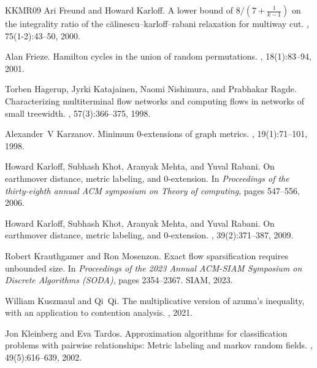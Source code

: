 \documentclass[11pt]{article}
\theoremstyle{definition}
\begin{document}
\begin{thebibliography}{KKMR09}
Ari Freund and Howard Karloff.
\newblock A lower bound of {$8/(7+ \frac{1}{k-1})$} on the integrality ratio of
  the c{\u{a}}linescu--karloff--rabani relaxation for multiway cut.
, 75(1-2):43--50, 2000.

Alan Frieze.
\newblock Hamilton cycles in the union of random permutations.
, 18(1):83--94, 2001.

Torben Hagerup, Jyrki Katajainen, Naomi Nishimura, and Prabhakar Ragde.
\newblock Characterizing multiterminal flow networks and computing flows in
  networks of small treewidth.
, 57(3):366--375, 1998.

Alexander~V Karzanov.
\newblock Minimum 0-extensions of graph metrics.
, 19(1):71--101, 1998.

Howard Karloff, Subhash Khot, Aranyak Mehta, and Yuval Rabani.
\newblock On earthmover distance, metric labeling, and 0-extension.
\newblock In {\em Proceedings of the thirty-eighth annual ACM symposium on
  Theory of computing}, pages 547--556, 2006.

Howard Karloff, Subhash Khot, Aranyak Mehta, and Yuval Rabani.
\newblock On earthmover distance, metric labeling, and 0-extension.
, 39(2):371--387, 2009.

Robert Krauthgamer and Ron Mosenzon.
\newblock Exact flow sparsification requires unbounded size.
\newblock In {\em Proceedings of the 2023 Annual ACM-SIAM Symposium on Discrete
  Algorithms (SODA)}, pages 2354--2367. SIAM, 2023.

William Kuszmaul and Qi~Qi.
\newblock The multiplicative version of azuma's inequality, with an application
  to contention analysis.
, 2021.

Jon Kleinberg and Eva Tardos.
\newblock Approximation algorithms for classification problems with pairwise
  relationships: Metric labeling and markov random fields.
, 49(5):616--639, 2002.


\end{thebibliography}
\end{document}
